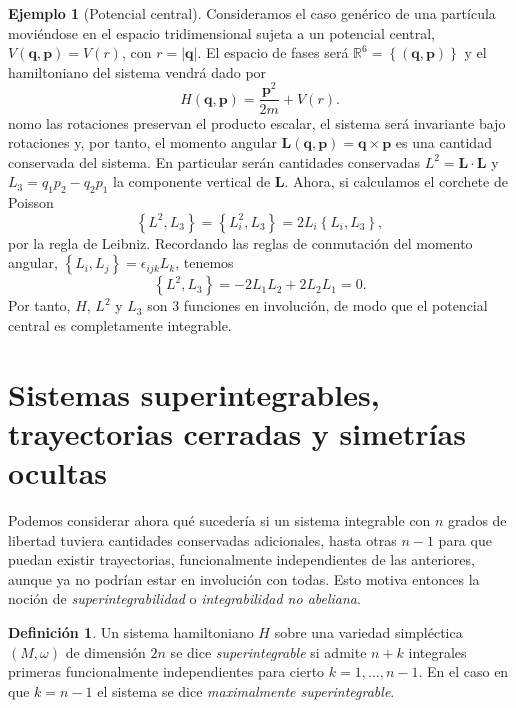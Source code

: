 \documentclass[12pt,a4paper,twocolumn,reqno]{amsart}
\theoremstyle{definition} \newtheorem{defn}[thm]{Definición}
\theoremstyle{definition} \newtheorem{ejemplo}[thm]{Ejemplo}
\theoremstyle{definition} \newtheorem{ejercicio}[thm]{Ejercicio}
\theoremstyle{remark} \newtheorem*{obs}{Observación}
\def\RR{\mathbb{R}}
\newcommand{\vect}[1]{\mathbf{#1}}
\newcommand{\pois}[2]{\left\lbrace#1,#2\right\rbrace}
\begin{document}
  \begin{ejemplo}[Potencial central]
    Consideramos el caso genérico de una partícula moviéndose en el espacio tridimensional sujeta a un potencial central, $V(\vect{q},\vect{p})=V(r)$, con $r=|\vect{q}|$. El espacio de fases será $\RR^6=\left\{ (\vect{q},\vect{p}) \right\}$ y el hamiltoniano del sistema vendrá dado por
    \begin{equation}
      H(\vect{q},\vect{p})=\frac{\vect{p}^2}{2m}+V(r).
      \label{eq:central}
    \end{equation}
    nomo las rotaciones preservan el producto escalar, el sistema será invariante bajo rotaciones y, por tanto, el momento angular $\vect{L}(\vect{q},\vect{p})=\vect{q}\times \vect{p}$ es una cantidad conservada del sistema. En particular serán cantidades conservadas $L^2=\vect{L}\cdot \vect{L}$ y $L_3=q_1p_2-q_2p_1$ la componente vertical de $\vect{L}$. Ahora, si calculamos el corchete de Poisson
  \begin{equation*}
    \pois{L^2}{L_3}=\pois{L_i^2}{L_3}=2L_i\pois{L_i}{L_3},
  \end{equation*}
  por la regla de Leibniz. Recordando las reglas de conmutación del momento angular, $\left\{ L_i,L_j \right\}=\epsilon_{ijk}L_k$, tenemos
\begin{equation*}
  \pois{L^2}{L_3}=-2L_1L_2+2L_2L_1=0.
\end{equation*}
Por tanto, $H$, $L^2$ y $L_3$ son $3$ funciones en involución, de modo que el potencial central es completamente integrable.

  \end{ejemplo}
  \section{Sistemas superintegrables, trayectorias cerradas y simetrías ocultas}
  Podemos considerar ahora qué sucedería si un sistema integrable con $n$ grados de libertad tuviera cantidades conservadas adicionales, hasta otras $n-1$ para que puedan existir trayectorias, funcionalmente independientes de las anteriores, aunque ya no podrían estar en involución con todas. Esto motiva entonces la noción de \emph{superintegrabilidad} o \emph{integrabilidad no abeliana}.
  \begin{defn}
    Un sistema hamiltoniano $H$ sobre una variedad simpléctica $(M,\omega)$ de dimensión $2n$ se dice \emph{superintegrable} si admite $n+k$ integrales primeras funcionalmente independientes para cierto $k=1,\dots,n-1$. En el caso en que $k=n-1$ el sistema se dice \emph{maximalmente superintegrable}.
  \end{defn}
\end{document}
